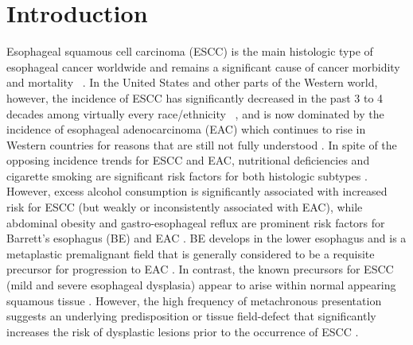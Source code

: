 \documentclass[10pt,letterpaper]{article}
\begin{document}
\linenumbers

\section*{Introduction}
Esophageal squamous cell carcinoma (ESCC) is the main histologic type of esophageal cancer worldwide and remains a significant cause of cancer morbidity and mortality ~\cite{Wang2018}. In the United States and other parts of the Western world, however, the incidence of ESCC has significantly decreased in the past 3 to 4 decades among virtually every race/ethnicity ~\cite{Wang2018, Gonzalez2013}, and is now dominated by the incidence of esophageal adenocarcinoma (EAC) which continues to rise in Western countries for reasons that are still not fully understood \cite{Kroep2014,Hazelton2015}. In spite of the opposing incidence trends for ESCC and EAC, nutritional deficiencies and  cigarette smoking are significant risk factors for both histologic subtypes \cite{Castro2018, Xie2018, NavarroSilvera2014}. However, excess alcohol consumption is significantly associated with increased risk for ESCC (but weakly or inconsistently associated with EAC), while abdominal obesity and gastro-esophageal reflux are prominent risk factors for Barrett's esophagus (BE) and EAC \cite{Castro2018, Xie2018, Thrift2014, Hazelton2015,NavarroSilvera2014, Drahos2016}. BE develops in the lower esophagus and is a metaplastic premalignant field that is generally considered to be a requisite precursor for progression to EAC \cite{Zhang2018}. In contrast, the known precursors for ESCC (mild and severe esophageal dysplasia) appear to arise within normal appearing squamous tissue \cite{Lam2020}. However, the high frequency of metachronous presentation suggests an underlying predisposition or tissue field-defect that significantly increases the risk of dysplastic lesions prior to the occurrence of ESCC \cite{Tian1998, Katada2016, Kuwano1995}.  
\end{document}
